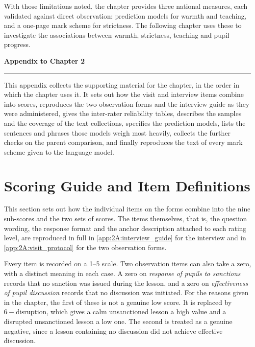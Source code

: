 With those limitations noted, the chapter provides three national measures, each validated against direct observation: prediction models for warmth and teaching, and a one-page mark scheme
for strictness. The following chapter uses these to investigate the associations between
warmth, strictness, teaching and pupil progress.

\begin{center}
  {\LARGE\bfseries Appendix to Chapter 2}\\[6pt]
  \rule{0.5\linewidth}{0.4pt}
\end{center}
\medskip
\noindent This appendix collects the supporting material for the chapter,
in the order in which the chapter uses it. It sets out how the visit and
interview items combine into scores, reproduces the two observation forms and
the interview guide as they were administered, gives the inter-rater
reliability tables, describes the samples and the coverage of the text
collections, specifies the prediction models, lists the sentences and phrases those models weigh most heavily, collects the further checks on the parent comparison, and finally reproduces the text of every mark scheme given to the language model.
\medskip

\section{Scoring Guide and Item Definitions}
\label{app:2A:guide}

This section sets out how the individual items on the forms combine into
the nine sub-scores and the two sets of scores. The items themselves, that
is, the question wording, the response format and the anchor description
attached to each rating level, are reproduced in full in
\cref{app:2A:interview_guide} for the interview and in
\cref{app:2A:visit_protocol} for the two observation forms.

Every item is recorded on a 1--5 scale. Two observation items can also take
a zero, with a distinct meaning in each case. A zero on \emph{response of
pupils to sanctions} records that no sanction was issued during the lesson,
and a zero on \emph{effectiveness of pupil discussion} records that no
discussion was initiated. For the reasons given in the chapter, the first of these is not a genuine low score. It is replaced by $6 - \text{disruption}$, which gives a calm unsanctioned lesson a high value
and a disrupted unsanctioned lesson a low one. The second is treated as a
genuine negative, since a lesson containing no discussion did not achieve
effective discussion.

